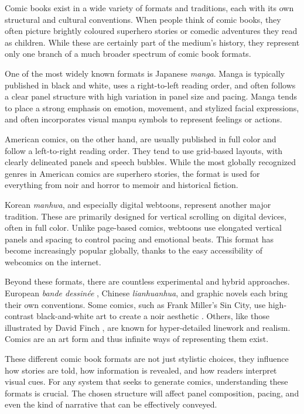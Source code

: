 Comic books exist in a wide variety of formats and traditions, each with its own structural and cultural conventions. When people think of comic books, they often picture brightly coloured superhero stories or comedic adventures they read as children. While these are certainly part of the medium's history, they represent only one branch of a much broader spectrum of comic book formats.

One of the most widely known formats is Japanese \textit{manga}. Manga is typically published in black and white, uses a right-to-left reading order, and often follows a clear panel structure with high variation in panel size and pacing. Manga tends to place a strong emphasis on emotion, movement, and stylized facial expressions, and often incorporates visual manpu symbols to represent feelings or actions.

American comics, on the other hand, are usually published in full color and follow a left-to-right reading order. They tend to use grid-based layouts, with clearly delineated panels and speech bubbles. While the most globally recognized genres in American comics are superhero stories, the format is used for everything from noir and horror to memoir and historical fiction.

Korean \textit{manhwa}, and especially digital webtoons, represent another major tradition. These are primarily designed for vertical scrolling on digital devices, often in full color. Unlike page-based comics, webtoons use elongated vertical panels and spacing to control pacing and emotional beats. This format has become increasingly popular globally, thanks to the easy accessibility of webcomics on the internet.

Beyond these formats, there are countless experimental and hybrid approaches. European \textit{bande dessinée} , Chinese \textit{lianhuanhua}, and graphic novels each bring their own conventions. Some comics, such as Frank Miller's Sin City, use high-contrast black-and-white art to create a noir aesthetic \cite{miller1991sincity}. Others, like those illustrated by David Finch \cite{finch2024portfolio}, are known for hyper-detailed linework and realism. Comics are an art form and thus infinite ways of representing them exist.

These different comic book formats are not just stylistic choices, they influence how stories are told, how information is revealed, and how readers interpret visual cues. For any system that seeks to generate comics, understanding these formats is crucial. The chosen structure will affect panel composition, pacing, and even the kind of narrative that can be effectively conveyed.

